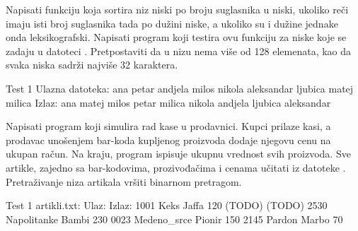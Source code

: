 \begin{Exercise}[label=509]
  Napisati funkciju koja sortira niz niski po broju suglasnika u
  niski, ukoliko reči imaju isti broj suglasnika tada po dužini niske,
  a ukoliko su i dužine jednake onda leksikografski.  Napisati program
  koji testira ovu funkciju za niske koje se zadaju u datoteci
  .  Pretpostaviti da u nizu nema više od 128
  elemenata, kao da svaka niska sadrži najviše 32 karaktera.
  
\begin{maxitest}
\begin{test}{Test 1}
Ulazna datoteka:
ana petar andjela milos nikola aleksandar ljubica matej milica
Izlaz:
ana matej milos petar milica nikola andjela ljubica aleksandar
\end{test}
\end{maxitest}
  
\end{Exercise}

\begin{Exercise}[label=509]
  Napisati program koji simulira rad kase u prodavnici. Kupci prilaze
  kasi, a prodavac unošenjem bar-koda kupljenog proizvoda dodaje
  njegovu cenu na ukupan račun. Na kraju, program ispisuje ukupnu
  vrednost svih proizvoda. Sve artikle, zajedno sa bar-kodovima,
  prozivođačima i cenama učitati iz datoteke
  . Pretraživanje niza artikala vršiti binarnom
  pretragom.
  
\begin{maxitest}
\begin{test}{Test 1}
artikli.txt:                         Ulaz:           Izlaz:
1001 Keks Jaffa 120                  (TODO)          (TODO)
2530 Napolitanke Bambi	230
0023 Medeno_srce Pionir 150
2145 Pardon Marbo 70
\end{test}
\end{maxitest}
  
\end{Exercise}

